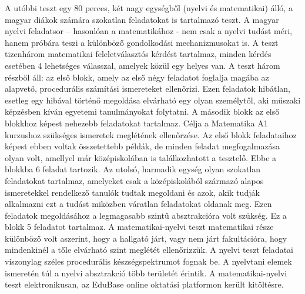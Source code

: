 \documentclass[12pt]{article}
\begin{document}
A utóbbi teszt egy 80 perces, két nagy egységből (nyelvi és matematikai) álló, a magyar diákok számára szokatlan feladatokat is tartalmazó teszt. A magyar nyelvi feladatsor – hasonlóan a matematikához - nem csak a nyelvi tudást méri, hanem próbára teszi a különböző gondolkodási mechanizmusokat is. A teszt tizenhárom matematikai feleletválasztós kérdést tartalmaz, minden kérdés esetében 4 lehetséges válasszal, amelyek közül egy helyes van. A teszt három részből áll: az első blokk, amely az első négy feladatot foglalja magába az alapvető, procedurális számítási ismereteket ellenőrizi. Ezen feladatok hibátlan, esetleg egy hibával történő megoldása elvárható egy olyan személytől, aki műszaki képzésben kíván egyetemi tanulmányokat folytatni. A második blokk az első blokkhoz képest nehezebb feladatokat tartalmaz. Célja a Matematika A1 kurzushoz szükséges ismeretek meglétének ellenőrzése. Az első blokk feladataihoz képest ebben voltak összetettebb példák, de minden feladat megfogalmazása olyan volt, amellyel már középiskolában is találkozhatott a tesztelő. Ebbe a blokkba 6 feladat tartozik. Az utolsó, harmadik egység olyan szokatlan feladatokat tartalmaz, amelyeket csak a középiskolából származó alapos ismeretekkel rendelkező tanulók tudtak megoldani és azok, akik tudják alkalmazni ezt a tudást miközben váratlan feladatokat oldanak meg. Ezen feladatok megoldásához a legmagasabb szintű absztrakcióra volt szükség. Ez a blokk 5 feladatot tartalmaz. A matematikai-nyelvi teszt matematikai része különböző volt aszerint, hogy a hallgató járt, vagy nem járt fakultációra, hogy mindenkinél a tőle elvárható szint meglétét ellenőrizzük. A nyelvi teszt feladatai viszonylag széles procedurális készségspektrumot fognak be. A nyelvtani elemek ismeretén túl a nyelvi absztrakció több területét érintik. A matematikai-nyelvi teszt elektronikusan, az EduBase online oktatási platformon került kitöltésre.
\end{document}
